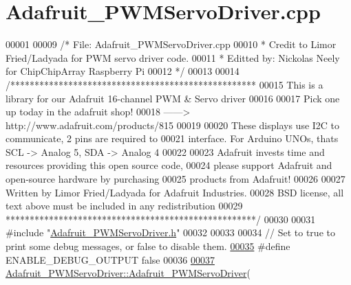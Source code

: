 \hypertarget{Adafruit__PWMServoDriver_8cpp_source}{\section{Adafruit\+\_\+\+P\+W\+M\+Servo\+Driver.\+cpp}
\label{Adafruit__PWMServoDriver_8cpp_source}
}

\begin{DoxyCode}
00001 
00009 \textcolor{comment}{/* File: Adafruit\_PWMServoDriver.cpp}
00010 \textcolor{comment}{ * Credit to Limor Fried/Ladyada for PWM servo driver code. }
00011 \textcolor{comment}{ * Editted by: Nickolas Neely for ChipChipArray Raspberry Pi }
00012 \textcolor{comment}{ */}
00013 
00014 \textcolor{comment}{/*************************************************** }
00015 \textcolor{comment}{  This is a library for our Adafruit 16-channel PWM & Servo driver}
00016 \textcolor{comment}{}
00017 \textcolor{comment}{  Pick one up today in the adafruit shop!}
00018 \textcolor{comment}{  ------> http://www.adafruit.com/products/815}
00019 \textcolor{comment}{}
00020 \textcolor{comment}{  These displays use I2C to communicate, 2 pins are required to  }
00021 \textcolor{comment}{  interface. For Arduino UNOs, thats SCL -> Analog 5, SDA -> Analog 4}
00022 \textcolor{comment}{}
00023 \textcolor{comment}{  Adafruit invests time and resources providing this open source code, }
00024 \textcolor{comment}{  please support Adafruit and open-source hardware by purchasing }
00025 \textcolor{comment}{  products from Adafruit!}
00026 \textcolor{comment}{}
00027 \textcolor{comment}{  Written by Limor Fried/Ladyada for Adafruit Industries.  }
00028 \textcolor{comment}{  BSD license, all text above must be included in any redistribution}
00029 \textcolor{comment}{ ****************************************************/}
00030 
00031 \textcolor{preprocessor}{#include "\hyperlink{Adafruit__PWMServoDriver_8h}{Adafruit\_PWMServoDriver.h}"}
00032 
00033 
00034 \textcolor{comment}{// Set to true to print some debug messages, or false to disable them.}
\hypertarget{Adafruit__PWMServoDriver_8cpp_source_l00035}{}\hyperlink{Adafruit__PWMServoDriver_8cpp_a818989cbf7f37dae193fbb28b2d3976a}{00035} \textcolor{preprocessor}{#define ENABLE\_DEBUG\_OUTPUT false}
00036 
\hypertarget{Adafruit__PWMServoDriver_8cpp_source_l00037}{}\hyperlink{classAdafruit__PWMServoDriver_a6a949db60836febbc61adef4cc5429ed}{00037} \hyperlink{classAdafruit__PWMServoDriver_a6a949db60836febbc61adef4cc5429ed}{Adafruit\_PWMServoDriver::Adafruit\_PWMServoDriver}(

\end{DoxyCode}
